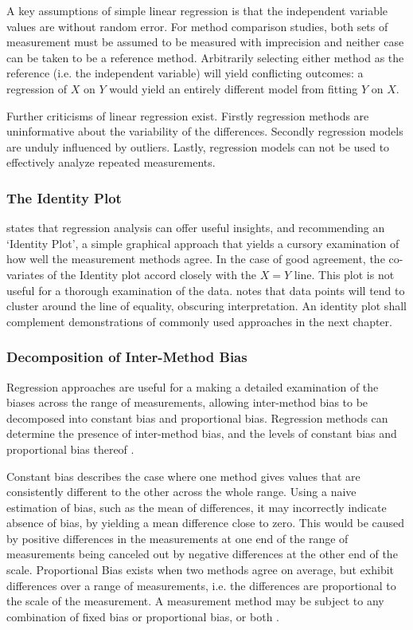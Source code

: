 \documentclass[12pt, a4paper]{report}
\theoremstyle{plain}
\theoremstyle{definition}
\theoremstyle{remark}
\begin{document}
	A key assumptions of simple linear regression is that the independent variable values are without random error. 	
	For method comparison studies, both sets of measurement must be assumed to be measured with imprecision and neither case can be taken to be a reference method. Arbitrarily
	selecting either method as the reference (i.e. the independent variable) will yield conflicting outcomes: a regression of $X$ on $Y$ would yield an entirely different model from fitting $Y$ on $X$.
	
	Further criticisms of linear regression exist.
	Firstly regression methods are uninformative about the variability of the differences. Secondly regression models are unduly influenced by outliers. Lastly, regression models can not be used to effectively analyze repeated measurements.	
	
	
	
	
	
	
	
	\subsubsection*{The Identity Plot}
	\citet{BA83} states that regression analysis can offer useful insights, and recommending an `Identity Plot', a simple graphical approach that yields a cursory examination of how well the measurement methods agree. In the case of good agreement, the co-variates of the Identity plot accord closely with the $X=Y$ line. This plot is not useful for a thorough examination of the data. \citet{BritHypSoc} notes that data points will tend to cluster around the line of equality,
	obscuring interpretation. An identity plot shall complement demonstrations of commonly used approaches in the next chapter.
	
	
	\subsubsection*{Decomposition of Inter-Method Bias}
	Regression approaches are useful for a making a detailed examination of the biases across the range of measurements, allowing inter-method bias to be decomposed into constant bias and proportional bias. Regression methods can determine the presence of inter-method bias, and the levels of constant bias and proportional bias thereof \cite{ludbrook97,ludbrook02}. 
	
	Constant bias describes the case where one method gives values that are consistently different to the other across the whole range. Using a naive estimation of bias, such as the mean of differences, it may incorrectly indicate absence of bias, by yielding a mean difference close to zero. This would be caused by positive differences in the measurements at one end of the range of measurements being canceled out by negative differences at the other end of the scale. Proportional Bias exists when two methods agree on average, but exhibit differences over a range of measurements, i.e. the differences are proportional to the scale of the measurement.	A measurement method may be subject to any combination of fixed bias or proportional bias, or both \citep{ludbrook02}. 
	
\end{document}
